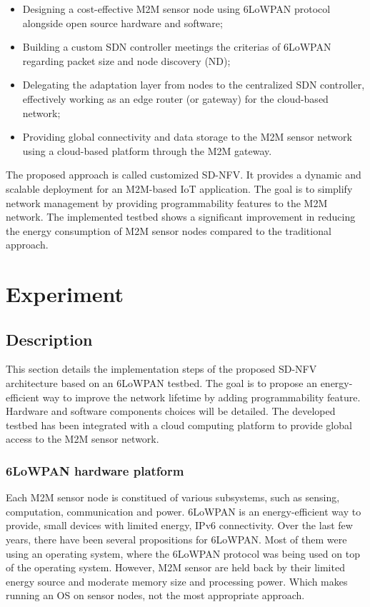 \documentclass[10pt,journal,compsoc]{IEEEtran}
\begin{document}
\begin{itemize}
    \item Designing a cost-effective M2M sensor node using 6LoWPAN 
    protocol alongside open source hardware and software;
    \item Building a custom SDN controller meetings the criterias of
    6LoWPAN regarding packet size and node discovery (ND);
    \item Delegating the adaptation layer from nodes to the centralized 
    SDN controller, effectively working as an edge router (or gateway) for 
    the cloud-based network;
    \item Providing global connectivity and data storage to the M2M sensor 
    network using a cloud-based platform through the M2M gateway.
\end{itemize}
The proposed approach is called customized SD-NFV. It provides a dynamic 
and scalable deployment for an M2M-based IoT application. The goal is 
to simplify network management by providing programmability features 
to the M2M network. The implemented testbed shows a significant 
improvement in reducing the energy consumption of M2M sensor nodes 
compared to the traditional approach.

\section{Experiment}\label{sec:experiment}
\subsection{Description}

This section details the implementation steps of the proposed SD-NFV 
architecture based on an 6LoWPAN testbed. The goal is to propose 
an energy-efficient way to improve the network lifetime by adding 
programmability feature. Hardware and software components choices 
will be detailed. The developed testbed has been integrated with a cloud 
computing platform to provide global access to the M2M sensor network.

\subsubsection{6LoWPAN hardware platform}

Each M2M sensor node is constitued of various subsystems, such as 
sensing, computation, communication and power. 6LoWPAN is an 
energy-efficient way to provide, small devices with limited energy, 
IPv6 connectivity. Over the last few years, there have been several 
propositions for 6LoWPAN. Most of them were using an operating system, 
where the 6LoWPAN protocol was being used on top of the operating system. 
However, M2M sensor are held back by their limited energy source and 
moderate memory size and processing power. Which makes running an OS 
on sensor nodes, not the most appropriate approach.
\end{document}
